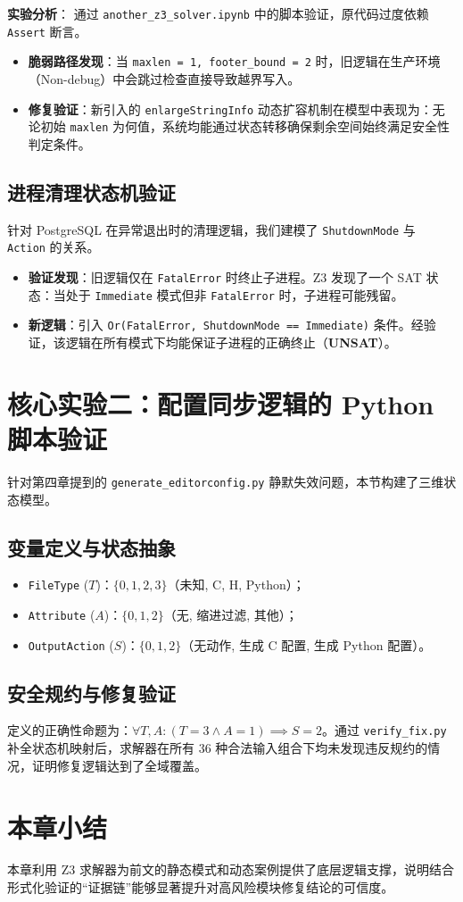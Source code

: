 \textbf{实验分析}：
通过 \texttt{another\_z3\_solver.ipynb} 中的脚本验证，原代码过度依赖 \texttt{Assert} 断言。
\begin{itemize}
    \item \textbf{脆弱路径发现}：当 \texttt{maxlen = 1, footer\_bound = 2} 时，旧逻辑在生产环境（Non-debug）中会跳过检查直接导致越界写入。
    \item \textbf{修复验证}：新引入的 \texttt{enlargeStringInfo} 动态扩容机制在模型中表现为：无论初始 \texttt{maxlen} 为何值，系统均能通过状态转移确保剩余空间始终满足安全性判定条件。
\end{itemize}

\subsection{进程清理状态机验证}
针对 PostgreSQL 在异常退出时的清理逻辑，我们建模了 \texttt{ShutdownMode} 与 \texttt{Action} 的关系。
\begin{itemize}
    \item \textbf{验证发现}：旧逻辑仅在 \texttt{FatalError} 时终止子进程。Z3 发现了一个 SAT 状态：当处于 \texttt{Immediate} 模式但非 \texttt{FatalError} 时，子进程可能残留。
    \item \textbf{新逻辑}：引入 \texttt{Or(FatalError, ShutdownMode == Immediate)} 条件。经验证，该逻辑在所有模式下均能保证子进程的正确终止（\textbf{UNSAT}）。
\end{itemize}

\section{核心实验二：配置同步逻辑的 Python 脚本验证}
针对第四章提到的 \texttt{generate\_editorconfig.py} 静默失效问题，本节构建了三维状态模型。

\subsection{变量定义与状态抽象}
\begin{itemize}
    \item \texttt{FileType} ($T$)：$\{0, 1, 2, 3\}$（未知, C, H, Python）；
    \item \texttt{Attribute} ($A$)：$\{0, 1, 2\}$（无, 缩进过滤, 其他）；
    \item \texttt{OutputAction} ($S$)：$\{0, 1, 2\}$（无动作, 生成 C 配置, 生成 Python 配置）。
\end{itemize}

\subsection{安全规约与修复验证}
定义的正确性命题为：$\forall T, A: (T=3 \land A=1) \implies S=2$。通过 \texttt{verify\_fix.py} 补全状态机映射后，求解器在所有 36 种合法输入组合下均未发现违反规约的情况，证明修复逻辑达到了全域覆盖。

\section{本章小结}
本章利用 Z3 求解器为前文的静态模式和动态案例提供了底层逻辑支撑，说明结合形式化验证的“证据链”能够显著提升对高风险模块修复结论的可信度。